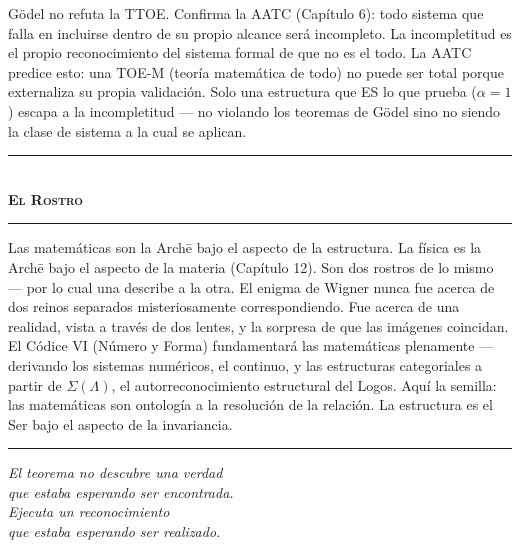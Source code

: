 \documentclass[10pt, openany, oneside]{book}
\renewcommand{\normalsize}{\fontsize{10}{13}\selectfont}
\begin{document}
G\"{o}del no refuta la TTOE. Confirma la AATC (Capítulo 6): todo sistema que falla en incluirse dentro de su propio alcance será incompleto. La incompletitud es el propio reconocimiento del sistema formal de que no es el todo. La AATC predice esto: una TOE-M (teoría matemática de todo) no puede ser total porque externaliza su propia validación. Solo una estructura que ES lo que prueba ($\alpha = 1$) escapa a la incompletitud --- no violando los teoremas de G\"{o}del sino no siendo la clase de sistema a la cual se aplican.

\vspace{1.5em}


\begin{center}
    \rule{0.3\textwidth}{0.4pt}\\[0.5em]
    {\normalsize\bfseries\scshape El Rostro}\\[0.3em]
    \rule{0.3\textwidth}{0.4pt}
\end{center}

\vspace{1em}

\noindent Las matemáticas son la Arch\={e} bajo el aspecto de la estructura. La física es la Arch\={e} bajo el aspecto de la materia (Capítulo 12). Son dos rostros de lo mismo --- por lo cual una describe a la otra. El enigma de Wigner nunca fue acerca de dos reinos separados misteriosamente correspondiendo. Fue acerca de una realidad, vista a través de dos lentes, y la sorpresa de que las imágenes coincidan. El Códice VI (Número y Forma) fundamentará las matemáticas plenamente --- derivando los sistemas numéricos, el continuo, y las estructuras categoriales a partir de $\Sigma(\Lambda)$, el autorreconocimiento estructural del Logos. Aquí la semilla: las matemáticas son ontología a la resolución de la relación. La estructura es el Ser bajo el aspecto de la invariancia.

\vspace{2em}

\begin{center}
    \rule{0.15\textwidth}{0.3pt}
\end{center}

\vspace{0.5em}

\begin{center}
    \itshape
    El teorema no descubre una verdad\\
    que estaba esperando ser encontrada.\\[0.8em]
    Ejecuta un reconocimiento\\
    que estaba esperando ser realizado.
\end{center}
\end{document}
